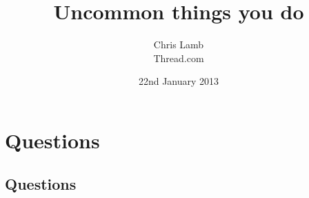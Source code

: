 \documentclass{beamer}
\title{Uncommon things you do}
\author{Chris Lamb \\ Thread.com}
\date{22nd January 2013}
\begin{document}
\frame{
	\titlepage
}

\setlength{\parskip}{1cm}

\section{Questions}

	\subsection{Questions}
\end{document}
